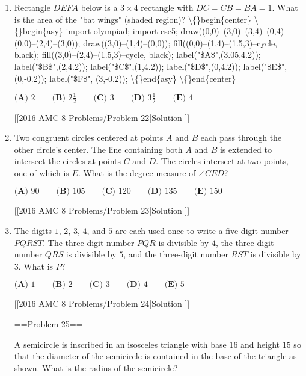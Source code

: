\documentclass{article}
\begin{document}
\begin{enumerate}[label=\arabic*., itemsep=0.5em]
[[2016 AMC 8 Problems/Problem 21|Solution
]]\par \vspace{0.5em}\item Rectangle \(DEFA\) below is a \(3 \times 4\) rectangle with \(DC=CB=BA=1\). What is the area of the "bat wings" (shaded region)?
\textbackslash\{\}begin\{center\}
\textbackslash\{\}begin\{asy\}
import olympiad;
import cse5;
draw((0,0)--(3,0)--(3,4)--(0,4)--(0,0)--(2,4)--(3,0));
draw((3,0)--(1,4)--(0,0));
fill((0,0)--(1,4)--(1.5,3)--cycle, black);
fill((3,0)--(2,4)--(1.5,3)--cycle, black);
label("\$A\$",(3.05,4.2));
label("\$B\$",(2,4.2));
label("\$C\$",(1,4.2));
label("\$D\$",(0,4.2));
label("\$E\$", (0,-0.2));
label("\$F\$", (3,-0.2));
\textbackslash\{\}end\{asy\}
\textbackslash\{\}end\{center\}


\(\textbf{(A) }2\qquad\textbf{(B) }2 \frac{1}{2}\qquad\textbf{(C) }3\qquad\textbf{(D) }3 \frac{1}{2}\qquad \textbf{(E) }4\)

[[2016 AMC 8 Problems/Problem 22|Solution
]]\par \vspace{0.5em}\item Two congruent circles centered at points \(A\) and \(B\) each pass through the other circle's center. The line containing both \(A\) and \(B\) is extended to intersect the circles at points \(C\) and \(D\). The circles intersect at two points, one of which is \(E\). What is the degree measure of \(\angle CED\)?

\(\textbf{(A) }90\qquad\textbf{(B) }105\qquad\textbf{(C) }120\qquad\textbf{(D) }135\qquad \textbf{(E) }150\)

[[2016 AMC 8 Problems/Problem 23|Solution
]]\par \vspace{0.5em}\item The digits \(1\), \(2\), \(3\), \(4\), and \(5\) are each used once to write a five-digit number \(PQRST\). The three-digit number \(PQR\) is divisible by \(4\), the three-digit number \(QRS\) is divisible by \(5\), and the three-digit number \(RST\) is divisible by \(3\). What is \(P\)?

\(\textbf{(A) }1\qquad\textbf{(B) }2\qquad\textbf{(C) }3\qquad\textbf{(D) }4\qquad \textbf{(E) }5\)

[[2016 AMC 8 Problems/Problem 24|Solution
]]

==Problem 25== 

A semicircle is inscribed in an isosceles triangle with base \(16\) and height \(15\) so that the diameter of the semicircle is contained in the base of the triangle as shown. What is the radius of the semicircle?



\end{enumerate}
\end{document}
